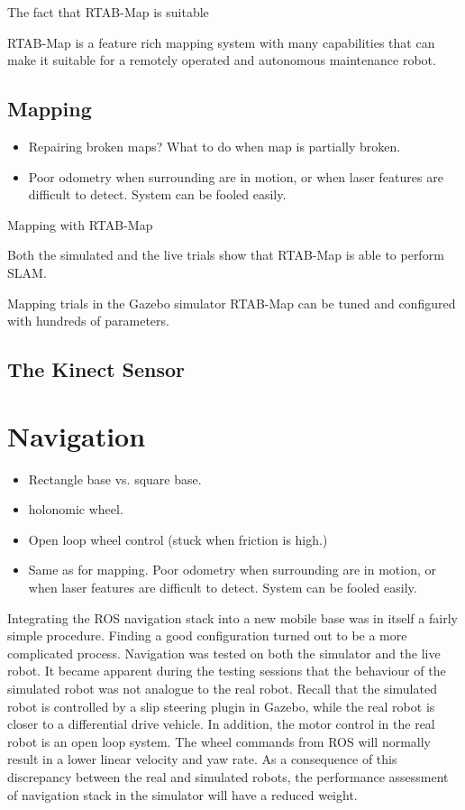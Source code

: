 The fact that \ac{RTAB-Map} is suitable

\ac{RTAB-Map} is a feature rich mapping system with many capabilities that can make it suitable for a remotely operated and autonomous maintenance robot. 

\subsection{Mapping}

\begin{itemize}
\item Repairing broken maps? What to do when map is partially broken.
\item Poor odometry when surrounding are in motion, or when laser features are difficult to detect. System can be fooled easily. 
\end{itemize}

Mapping with \ac{RTAB-Map} 

Both the simulated and the live trials show that \ac{RTAB-Map} is able to perform \ac{SLAM}. 

Mapping trials in the Gazebo simulator
\ac{RTAB-Map} can be tuned and configured with hundreds of parameters.

\subsection{The Kinect Sensor}



\section{Navigation}
\begin{itemize}
\item Rectangle base vs. square base.
\item holonomic wheel.
\item Open loop wheel control (stuck when friction is high.)
\item Same as for mapping. Poor odometry when surrounding are in motion, or when laser features are difficult to detect. System can be fooled easily. 
\end{itemize}

Integrating the \ac{ROS} navigation stack into a new mobile base was in itself a fairly simple procedure. Finding a good configuration turned out to be a more complicated process. Navigation was tested on both the simulator and the live robot. It became apparent during the testing sessions that the behaviour of the simulated robot was not analogue to the real robot. Recall that the simulated robot is controlled by a slip steering plugin in Gazebo, while the real robot is closer to a differential drive vehicle. In addition, the motor control in the real robot is an open loop system. The wheel commands from \ac{ROS} will normally result in a lower linear velocity and yaw rate. As a consequence of this discrepancy between the real and simulated robots, the performance assessment of navigation stack in the simulator will have a reduced weight.

